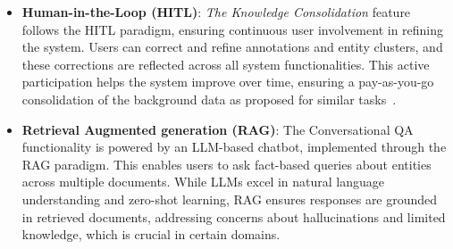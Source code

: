 \begin{itemize}
    \item \textbf{Human-in-the-Loop (HITL)}: \textit{The Knowledge Consolidation} feature follows the HITL paradigm, ensuring continuous user involvement in refining the system. Users can correct and refine annotations and entity clusters, and these corrections are reflected across all system functionalities. This active participation helps the system improve over time, ensuring a pay-as-you-go consolidation of the background data as proposed for similar tasks~\cite{de2024integrating,de2024interactive,cutrona2019asia,cruz2016quality}.
    \item \textbf{Retrieval Augmented generation (RAG)}: The Conversational QA functionality is powered by an LLM-based chatbot, implemented through the RAG paradigm. This enables users to ask fact-based queries about entities across multiple documents. While LLMs excel in natural language understanding and zero-shot learning, RAG ensures responses are grounded in retrieved documents, addressing concerns about hallucinations and limited knowledge, which is crucial in certain domains.
\end{itemize}




